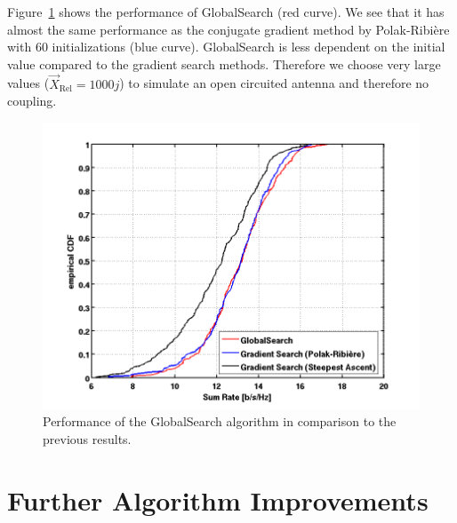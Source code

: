 Figure~\ref{fig:globals} shows the performance of GlobalSearch (red curve).
We see that it has almost the same performance as the conjugate gradient method by Polak-Ribi\`{e}re with 60 initializations (blue curve).
GlobalSearch is less dependent on the initial value compared to the gradient search methods.
Therefore we choose very large values ($\vec{X}_{\text{Rel}} = 1000j$) to simulate an open circuited antenna and therefore no coupling.
\begin{figure}[h]
\centering
  \includegraphics[width=0.7\linewidth]{images/Globalscomparison_edited.png}
\caption{Performance of the GlobalSearch algorithm in comparison to the previous results.}
\label{fig:globals}
\end{figure}

\section{Further Algorithm Improvements}

